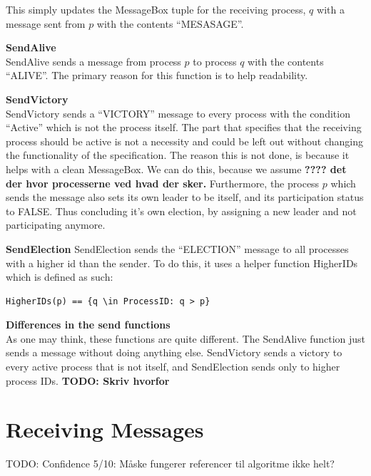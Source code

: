 \documentclass{report}
\begin{document}
This simply updates the MessageBox tuple for the receiving process, $q$ with a message sent from $p$ with the contents ``MESASAGE''.


\textbf{SendAlive}\\
SendAlive sends a message from process $p$ to process $q$ with the contents ``ALIVE''. The primary reason for this function is to help readability.

\textbf{SendVictory}\\
SendVictory sends a ``VICTORY'' message to every process with the condition ``Active'' which is not the process itself. The part that specifies that the receiving process should be active is not a necessity and could be left out without changing the functionality of the specification. The reason this is not done, is because it helps with a clean MessageBox. We can do this, because we assume \textbf{???? det der hvor processerne ved hvad der sker.}
Furthermore, the process $p$ which sends the message also sets its own leader to be itself, and its participation status to FALSE. Thus concluding it's own election, by assigning a new leader and not participating anymore.

\textbf{SendElection}
SendElection sends the ``ELECTION'' message to all processes with a higher id than the sender. To do this, it uses a helper function HigherIDs which is defined as such:
\begin{lstlisting}
HigherIDs(p) == {q \in ProcessID: q > p}
\end{lstlisting}

\textbf{Differences in the send functions}\\
As one may think, these functions are quite different. The SendAlive function just sends a message without doing anything else. SendVictory sends a victory to every active process that is not itself, and SendElection sends only to higher process IDs.
\textbf{TODO: Skriv hvorfor}

\section{Receiving Messages}
TODO: Confidence 5/10: Måske fungerer referencer til algoritme ikke helt?

\noindent{}
\end{document}
